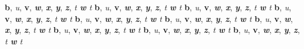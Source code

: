 \textbf{b}, \emph{u}, \textbf{v}, \emph{\textbf{w}}, \emph{\textbf{x}}, \textbf{\emph{y}}, \textbf{\emph{z}}, \emph{t \textbf{w} t}
\textbf{b}, \emph{u}, \textbf{v}, \emph{\textbf{w}}, \emph{\textbf{x}}, \textbf{\emph{y}}, \textbf{\emph{z}}, \emph{t \textbf{w} t}
\textbf{b}, \emph{u}, \textbf{v}, \emph{\textbf{w}}, \emph{\textbf{x}}, \textbf{\emph{y}}, \textbf{\emph{z}}, \emph{t \textbf{w} t}
\textbf{b}, \emph{u}, \textbf{v}, \emph{\textbf{w}}, \emph{\textbf{x}}, \textbf{\emph{y}}, \textbf{\emph{z}}, \emph{t \textbf{w} t}
\textbf{b}, \emph{u}, \textbf{v}, \emph{\textbf{w}}, \emph{\textbf{x}}, \textbf{\emph{y}}, \textbf{\emph{z}}, \emph{t \textbf{w} t}
\textbf{b}, \emph{u}, \textbf{v}, \emph{\textbf{w}}, \emph{\textbf{x}}, \textbf{\emph{y}}, \textbf{\emph{z}}, \emph{t \textbf{w} t}
\textbf{b}, \emph{u}, \textbf{v}, \emph{\textbf{w}}, \emph{\textbf{x}}, \textbf{\emph{y}}, \textbf{\emph{z}}, \emph{t \textbf{w} t}
\textbf{b}, \emph{u}, \textbf{v}, \emph{\textbf{w}}, \emph{\textbf{x}}, \textbf{\emph{y}}, \textbf{\emph{z}}, \emph{t \textbf{w} t}
\textbf{b}, \emph{u}, \textbf{v}, \emph{\textbf{w}}, \emph{\textbf{x}}, \textbf{\emph{y}}, \textbf{\emph{z}}, \emph{t \textbf{w} t}
\textbf{b}, \emph{u}, \textbf{v}, \emph{\textbf{w}}, \emph{\textbf{x}}, \textbf{\emph{y}}, \textbf{\emph{z}}, \emph{t \textbf{w} t}
